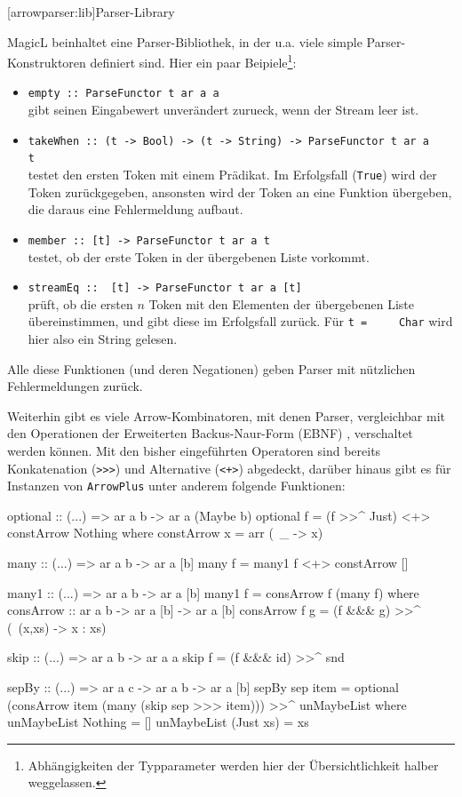 \documentclass[11pt, a4paper, bibgerm]{scrbook}
\newcommand\icode[1]{\lstinline?#1?}
\newcommand\lsection{}
\begin{document}
\lsection[arrowparser:lib]{Parser-Library}

MagicL beinhaltet eine Parser-Bibliothek, in der u.a. viele simple
Parser-Konstruktoren definiert sind. Hier ein paar
Beipiele\footnote{Abhängigkeiten der Typparameter werden hier der
  Übersichtlichkeit halber weggelassen.}:
\begin{itemize}
\item \icode{empty :: ParseFunctor t ar a a}\\
  gibt seinen Eingabewert unverändert zurueck, wenn der Stream leer ist.
\item \icode{takeWhen :: (t -> Bool) -> (t -> String) -> ParseFunctor t ar a
    t}\\
  testet den ersten Token mit einem Prädikat. Im Erfolgsfall (\icode{True}) wird der
  Token zurückgegeben, ansonsten wird der Token an eine Funktion
  übergeben, die daraus eine Fehlermeldung aufbaut.
\item \icode{member :: [t] -> ParseFunctor t ar a t}\\
  testet, ob der erste Token in der übergebenen Liste vorkommt.
\item \icode{streamEq ::  [t] -> ParseFunctor t ar a [t]}\\
  prüft, ob die ersten $n$ Token mit den Elementen der übergebenen Liste
  übereinstimmen, und gibt diese im Erfolgsfall zurück. Für \icode{t =
    Char} wird hier also ein String gelesen.
\end{itemize}

Alle diese Funktionen (und deren Negationen) geben Parser mit nützlichen
Fehlermeldungen zurück.

Weiterhin gibt es viele Arrow-Kombinatoren, mit denen Parser,
vergleichbar mit den Operationen der Erweiterten Backus-Naur-Form (EBNF)
\cite[S.43ff]{EBNF}, verschaltet werden können. Mit den bisher eingeführten
Operatoren sind bereits Konkatenation (\icode{>>>}) %
und Alternative (\icode{<+>}) abgedeckt, darüber hinaus gibt es für
Instanzen von \icode{ArrowPlus} unter anderem folgende Funktionen:

\begin{code}
optional :: (...) => ar a b -> ar a (Maybe b)
optional f = (f >>^ Just) <+> constArrow Nothing
  where constArrow x = arr (\ _ -> x)

many :: (...) => ar a b -> ar a [b]
many f = many1 f <+> constArrow []

many1 :: (...) => ar a b -> ar a [b]
many1 f = consArrow f (many f)
  where consArrow :: ar a b -> ar a [b] -> ar a [b]
        consArrow f g = (f &&& g) >>^ (\ (x,xs) -> x : xs)

skip :: (...) => ar a b -> ar a a
skip f = (f &&& id) >>^ snd

sepBy :: (...) => ar a c -> ar a b -> ar a [b]
sepBy sep item =
  optional (consArrow item (many (skip sep >>> item))) >>^ unMaybeList
    where
      unMaybeList  Nothing  = []
      unMaybeList (Just xs) = xs
\end{code} %
\end{document}
